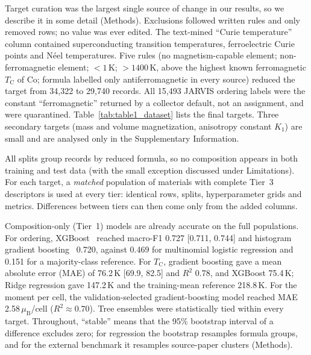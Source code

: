\documentclass[pdflatex,sn-nature]{sn-jnl}
\newcommand{\muB}{\ensuremath{\mu_\mathrm{B}}}
\newcommand{\Tc}{\ensuremath{T_\mathrm{C}}}
\begin{document}
Target curation was the largest single source of change in our results, so we describe it in some detail (Methods). Exclusions followed written rules and only removed rows; no value was ever edited. The text-mined ``Curie temperature'' column contained superconducting transition temperatures, ferroelectric Curie points and N\'eel temperatures. Five rules (no magnetism-capable element; non-ferromagnetic element; $<1$\,K; $>1400$\,K, above the highest known ferromagnetic \Tc{} of Co; formula labelled only antiferromagnetic in every source) reduced the target from 34,322 to 29,740 records. All 15,493 JARVIS ordering labels were the constant ``ferromagnetic'' returned by a collector default, not an assignment, and were quarantined. Table~\ref{tab:table1_dataset} lists the final targets. Three secondary targets (mass and volume magnetization, anisotropy constant $K_1$) are small and are analysed only in the Supplementary Information.

All splits group records by reduced formula, so no composition appears in both training and test data (with the small exception discussed under Limitations). For each target, a \emph{matched} population of materials with complete Tier~3 descriptors is used at every tier: identical rows, splits, hyperparameter grids and metrics. Differences between tiers can then come only from the added columns.



Composition-only (Tier~1) models are already accurate on the full populations. For ordering, XGBoost~\cite{chen2016xgboost} reached macro-F1 0.727 [0.711, 0.744] and histogram gradient boosting~\cite{ke2017lightgbm,pedregosa2011sklearn} 0.720, against 0.469 for multinomial logistic regression and 0.151 for a majority-class reference. For \Tc{}, gradient boosting gave a mean absolute error (MAE) of 76.2\,K [69.9, 82.5] and $R^2$ 0.78, and XGBoost 75.4\,K; Ridge regression gave 147.2\,K and the training-mean reference 218.8\,K. For the moment per cell, the validation-selected gradient-boosting model reached MAE 2.58\,\muB{}/cell ($R^2\approx0.70$). Tree ensembles were statistically tied within every target. Throughout, ``stable'' means that the 95\% bootstrap interval of a difference excludes zero; for regression the bootstrap resamples formula groups, and for the external benchmark it resamples source-paper clusters (Methods).

\end{document}
